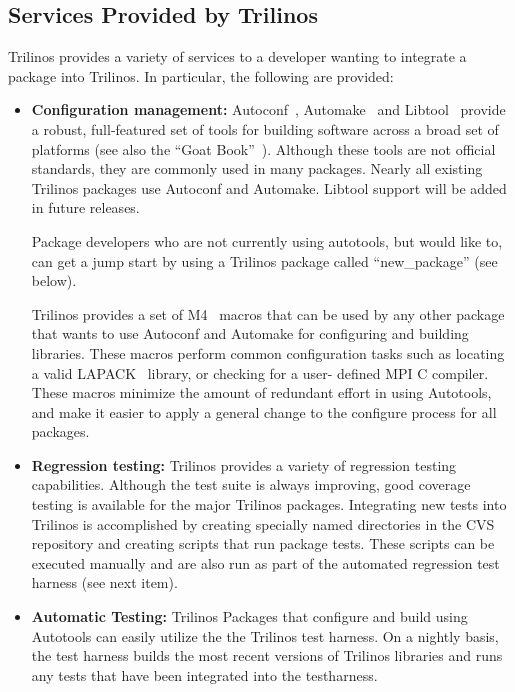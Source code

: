 \documentclass[12pt,relax]{TrilinosOverview}
\begin{document}
\subsection{Services Provided by Trilinos}

Trilinos provides a variety of services to a developer wanting to
integrate a package into Trilinos.  In particular, the following are
provided:
\begin{itemize}
\item {\bf Configuration management:}
Autoconf~\cite{Autoconf},  Automake~\cite{Automake} and
Libtool~\cite{Libtool} provide a robust, full-featured set of tools for
building software across a broad set of platforms (see also the ``Goat
Book''~\cite{GoatBook}).  Although these
tools are not official standards, they are commonly used in many
packages.  Nearly all existing
Trilinos packages use Autoconf and Automake.  Libtool support will be
added in future releases. 

Package developers who are not currently using autotools, but would like
to, can get a jump start by using a Trilinos package called
``new\_package'' (see below). 

Trilinos provides a set of M4~\cite{M4} macros that can be used by any other
package that wants to use Autoconf and Automake for configuring and
building libraries.  These macros perform common configuration tasks such as
locating a valid LAPACK~\cite{lapack} library, or checking for a user-
defined MPI C compiler.  These macros minimize the amount of redundant
 effort in using Autotools, and make it easier to apply a general change to
the configure process for all packages.

\item {\bf Regression testing:} Trilinos provides a variety of regression
testing capabilities.  Although the test suite is always improving,
good coverage testing is available for the major Trilinos packages.
Integrating new tests into Trilinos is accomplished by creating
specially named directories in the CVS repository and creating scripts
that run package tests.  These scripts can be executed manually and
are also run as part of the automated regression test harness (see
next item).

\item {\bf Automatic Testing:} Trilinos Packages that configure and build using 
Autotools can easily utilize the the Trilinos test harness.  On a nightly 
basis, the test harness builds the most recent versions of Trilinos libraries 
and runs any tests that have been integrated into the testharness.  


\end{itemize}
\end{document}
